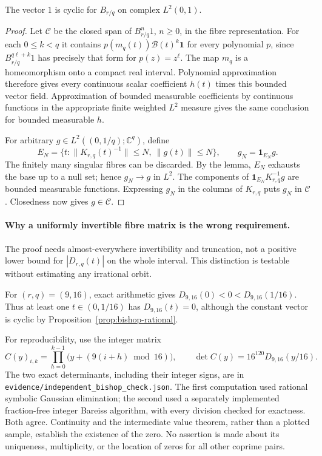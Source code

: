 \begin{proposition}\ours{}
\label{prop:bishop-rational}
The vector \(1\) is cyclic for \(B_{r/q}\) on complex \(L^2(0,1)\).
\end{proposition}
\begin{proof}
Let \(\mathcal C\) be the closed span of \(B_{r/q}^n1\), \(n\ge0\),
in the fibre representation.  For each \(0\le k<q\) it contains
\(p(m_q(t))\mathcal B(t)^k\mathbf1\) for every polynomial \(p\), since
\(B_{r/q}^{q\ell+k}1\) has precisely that form for \(p(z)=z^\ell\).
The map \(m_q\) is a homeomorphism onto a compact real interval.
Polynomial approximation therefore gives every continuous scalar
coefficient \(h(t)\) times this bounded vector field.  Approximation of
bounded measurable coefficients by continuous functions in the appropriate
finite weighted \(L^2\) measure gives the same conclusion for bounded
measurable \(h\).

For arbitrary \(g\in L^2((0,1/q);\mathbb C^q)\), define
\[
 E_N=\{t:\|K_{r,q}(t)^{-1}\|\le N,\ \|g(t)\|\le N\},
 \qquad g_N=\mathbf1_{E_N}g.
\]
The finitely many singular fibres can be discarded.  By the lemma,
\(E_N\) exhausts the base up to a null set; hence \(g_N\to g\) in
\(L^2\).  The components of
\(\mathbf1_{E_N}K_{r,q}^{-1}g\) are bounded measurable functions.
Expressing \(g_N\) in the columns of \(K_{r,q}\) puts \(g_N\) in
\(\mathcal C\).  Closedness now gives \(g\in\mathcal C\).
\end{proof}

\paragraph{Why a uniformly invertible fibre matrix is the wrong requirement.}
The proof needs almost-everywhere invertibility and truncation, not a
positive lower bound for \(|D_{r,q}(t)|\) on the whole interval.  This
distinction is testable without estimating any irrational orbit.

\begin{example}\oursComputed{}
\label{ex:bishop-singular}
For \((r,q)=(9,16)\), exact arithmetic gives
\(D_{9,16}(0)<0<D_{9,16}(1/16)\).  Thus at least one
\(t\in(0,1/16)\) has \(D_{9,16}(t)=0\), although the constant vector
is cyclic by Proposition~\ref{prop:bishop-rational}.
\end{example}
For reproducibility, use the integer matrix
\[
 C(y)_{i,k}=\prod_{h=0}^{k-1}\bigl(y+(9(i+h)\bmod16)\bigr),
 \qquad \det C(y)=16^{120}D_{9,16}(y/16).
\]
The two exact determinants, including their integer signs, are in
\nolinkurl{evidence/independent_bishop_check.json}.  The first computation
used rational symbolic Gaussian elimination; the second used a separately
implemented fraction-free integer Bareiss algorithm, with every division
checked for exactness.  Both agree.  Continuity and the intermediate value
theorem, rather than a plotted sample, establish the existence of the zero.
No assertion is made about its uniqueness, multiplicity, or the location
of zeros for all other coprime pairs.

